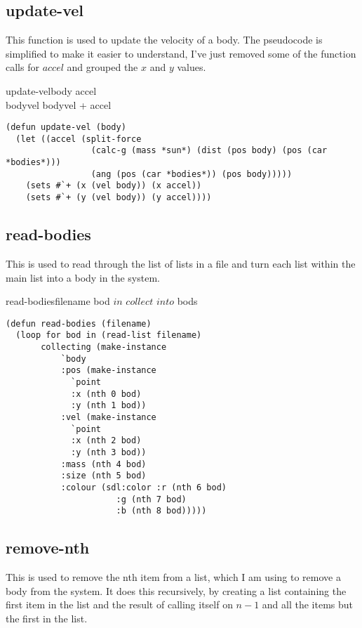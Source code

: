 \subsection{update-vel}
This function is used to update the velocity of a body. The pseudocode is
simplified to make it easier to understand, I've just removed some of the
function calls for $accel$ and grouped the $x$ and $y$ values. 

\begin{pseudocode}{update-vel}{body}
	\BEGIN
	accel \GETS {} \\
	bodyvel \GETS bodyvel + accel
	\END
\end{pseudocode}

\begin{lstlisting}
(defun update-vel (body)
  (let ((accel (split-force 
                 (calc-g (mass *sun*) (dist (pos body) (pos (car *bodies*)))
                 (ang (pos (car *bodies*)) (pos body)))))
    (sets #`+ (x (vel body)) (x accel))
    (sets #`+ (y (vel body)) (y accel))))
\end{lstlisting}

\subsection{read-bodies}
This is used to read through the list of lists in a file and turn each list
within the main list into a body in the system. \\
\begin{pseudocode}{read-bodies}{filename}
	\FOREACH bod $ in $ 
	\DO $collect $  $ into $ bods\\
\end{pseudocode}

\begin{lstlisting}
(defun read-bodies (filename)
  (loop for bod in (read-list filename)
       collecting (make-instance 
		   `body
		   :pos (make-instance
			 `point
			 :x (nth 0 bod)
			 :y (nth 1 bod))
		   :vel (make-instance
			 `point
			 :x (nth 2 bod)	
			 :y (nth 3 bod))
		   :mass (nth 4 bod)
		   :size (nth 5 bod)
		   :colour (sdl:color :r (nth 6 bod)
				      :g (nth 7 bod)
				      :b (nth 8 bod)))))
\end{lstlisting}

\subsection{remove-nth}
This is used to remove the nth item from a list, which I am using to remove a
body from the system. It does this recursively, by creating a list containing
the first item in the list and the result of calling itself on $n - 1$ and all
the items but the first in the list.\\

